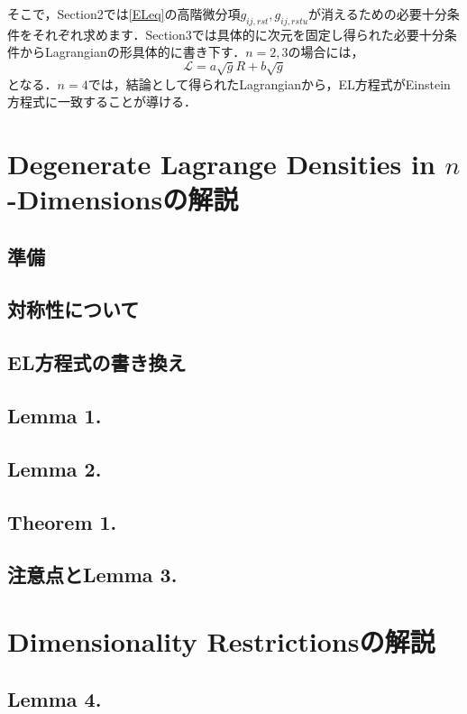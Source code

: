 \documentclass[12pt, a4paper]{jsarticle}
\begin{document}
そこで，Section2では\eqref{ELeq}の高階微分項\(g_{ij,rst}, g_{ij,rstu} \)が消えるための必要十分条件をそれぞれ求めます．Section3では具体的に次元を固定し得られた必要十分条件からLagrangianの形具体的に書き下す．\(n=2,3\)の場合には，
\begin{equation*}
  \mathscr{L} = a\sqrt{g}R + b \sqrt{g}
  \tag{3.1} \label{n=2,3}
\end{equation*}
となる．\(n=4\)では，結論として得られたLagrangianから，EL方程式がEinstein方程式に一致することが導ける．
\section{Degenerate Lagrange Densities in \(n\)-Dimensionsの解説}
\subsection{準備}

\subsection{対称性について}

\subsection{EL方程式の書き換え}

\subsection{Lemma 1.}

\subsection{Lemma 2.}

\subsection{Theorem 1.}

\subsection{注意点とLemma 3.}
\section{Dimensionality Restrictionsの解説}

\subsection{Lemma 4.}
\end{document}
